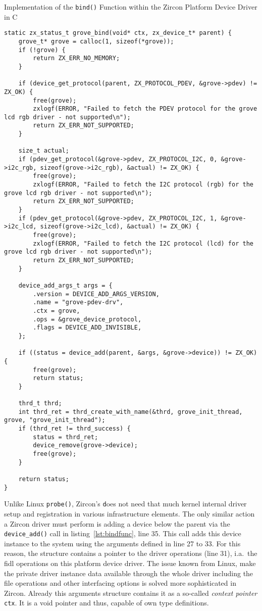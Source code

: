 \begin{listing} [H]
    \caption{Implementation of the \texttt{bind()} Function within the Zircon Platform Device Driver in C}
\label{lst:bindfunc}
\begin{verbatim}
static zx_status_t grove_bind(void* ctx, zx_device_t* parent) {
    grove_t* grove = calloc(1, sizeof(*grove));
    if (!grove) {
        return ZX_ERR_NO_MEMORY;
    }

    if (device_get_protocol(parent, ZX_PROTOCOL_PDEV, &grove->pdev) != ZX_OK) {
        free(grove);
        zxlogf(ERROR, "Failed to fetch the PDEV protocol for the grove lcd rgb driver - not supported\n");
        return ZX_ERR_NOT_SUPPORTED;
    }

    size_t actual;
    if (pdev_get_protocol(&grove->pdev, ZX_PROTOCOL_I2C, 0, &grove->i2c_rgb, sizeof(grove->i2c_rgb), &actual) != ZX_OK) {
        free(grove);
        zxlogf(ERROR, "Failed to fetch the I2C protocol (rgb) for the grove lcd rgb driver - not supported\n");
        return ZX_ERR_NOT_SUPPORTED;
    }
    if (pdev_get_protocol(&grove->pdev, ZX_PROTOCOL_I2C, 1, &grove->i2c_lcd, sizeof(grove->i2c_lcd), &actual) != ZX_OK) {
        free(grove);
        zxlogf(ERROR, "Failed to fetch the I2C protocol (lcd) for the grove lcd rgb driver - not supported\n");
        return ZX_ERR_NOT_SUPPORTED;
    }

    device_add_args_t args = {
        .version = DEVICE_ADD_ARGS_VERSION,
        .name = "grove-pdev-drv",
        .ctx = grove,
        .ops = &grove_device_protocol,
        .flags = DEVICE_ADD_INVISIBLE,
    };

    if ((status = device_add(parent, &args, &grove->device)) != ZX_OK) {
        free(grove);
        return status;
    }

    thrd_t thrd;
    int thrd_ret = thrd_create_with_name(&thrd, grove_init_thread, grove, "grove_init_thread");
    if (thrd_ret != thrd_success) {
        status = thrd_ret;
        device_remove(grove->device);
        free(grove);
    }

    return status;
}
\end{verbatim}
\end{listing}
%
Unlike Linux \texttt{probe()}, Zircon's \texttt does not need that much kernel internal driver setup and registration in various infrastructure elements.
The only similar action a Zircon driver must perform is adding a device below the parent via the \texttt{device_add()} call in listing~\ref{lst:bindfunc}, line 35.
This call adds this device instance to the system using the arguments defined in line 27 to 33.
For this reason, the structure contains a pointer to the driver operations (line 31), i.a.\ the \ac{fidl} operations on this platform device driver.
The issue known from Linux, make the private driver instance data available through the whole driver including the file operations and other interfacing options is solved more sophisticated in Zircon.
Already this arguments structure contains it as a so-called \textit{context pointer} \texttt{ctx}.
It is a void pointer and thus, capable of own type definitions.

